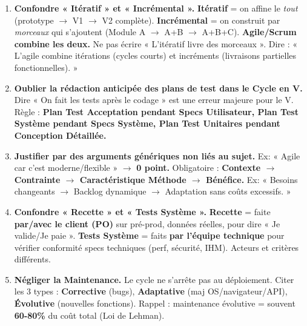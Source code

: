\documentclass[11pt]{article}
\begin{document}
\begin{attention}
\begin{enumerate}
    \item \textbf{Confondre « Itératif » et « Incrémental ».} \textbf{Itératif} = on affine le \emph{tout} (prototype $\rightarrow$ V1 $\rightarrow$ V2 complète). \textbf{Incrémental} = on construit par \emph{morceaux} qui s'ajoutent (Module A $\rightarrow$ A+B $\rightarrow$ A+B+C). \textbf{Agile/Scrum combine les deux.} Ne pas écrire « L'itératif livre des morceaux ». Dire : « L'agile combine itérations (cycles courts) et incréments (livraisons partielles fonctionnelles). »
    \item \textbf{Oublier la rédaction anticipée des plans de test dans le Cycle en V.} Dire « On fait les tests après le codage » est une erreur majeure pour le V. Règle : \textbf{Plan Test Acceptation pendant Specs Utilisateur, Plan Test Système pendant Specs Système, Plan Test Unitaires pendant Conception Détaillée.}
    \item \textbf{Justifier par des arguments génériques non liés au sujet.} Ex: « Agile car c'est moderne/flexible » $\rightarrow$ \textbf{0 point.} Obligatoire : \textbf{Contexte $\rightarrow$ Contrainte $\rightarrow$ Caractéristique Méthode $\rightarrow$ Bénéfice.} Ex: « Besoins changeants $\rightarrow$ Backlog dynamique $\rightarrow$ Adaptation sans coûts excessifs. »
    \item \textbf{Confondre « Recette » et « Tests Système ».} \textbf{Recette} = faite \textbf{par/avec le client (PO)} sur pré-prod, données réelles, pour dire « Je valide/Je paie ». \textbf{Tests Système} = faits \textbf{par l'équipe technique} pour vérifier conformité specs techniques (perf, sécurité, IHM). Acteurs et critères différents.
    \item \textbf{Négliger la Maintenance.} Le cycle ne s'arrête pas au déploiement. Citer les 3 types : \textbf{Corrective} (bugs), \textbf{Adaptative} (maj OS/navigateur/API), \textbf{Évolutive} (nouvelles fonctions). Rappel : maintenance évolutive = souvent \textbf{60-80\%} du coût total (Loi de Lehman).
\end{enumerate}
\end{attention}
\end{document}
